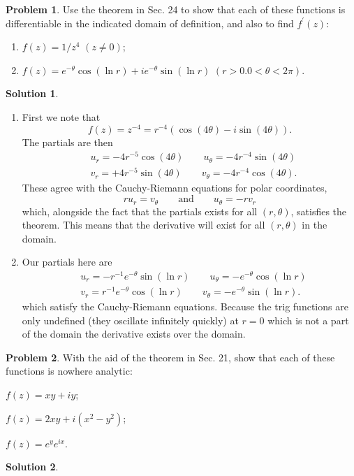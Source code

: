 \documentclass[10pt]{article}
\theoremstyle{definition}
\newtheorem{problem}{Problem}
\newtheorem{soln}{Solution}
\newcommand{\primed}[1]{#1^\prime}
\begin{document}
\begin{problem}
Use the theorem in Sec. 24 to show that each of these functions is differentiable in the
indicated domain of definition, and also to find $\primed{f}(z)$:
\begin{enumerate}[label=(\alph*)]
  \item $f(z)=1/z^4$ $(z\neq 0)$;
  \item $f(z)=e^{-\theta}\cos\left(\ln r\right)+ie^{-\theta}\sin\left(\ln r\right)$ $(r>0. 0<\theta<2\pi)$.
\end{enumerate}
\end{problem}
\begin{soln}~
  \begin{enumerate}[label=(\alph*)]
    \item First we note that
          $$f(z)=z^{-4}=r^{-4}\left(\cos\left(4\theta\right)-i\sin\left(4\theta\right)\right).$$
          The partials are then
          \begin{align*}
             & u_r=-4r^{-5}\cos\left(4\theta\right)\qquad u_\theta=-4r^{-4}\sin\left(4\theta\right)  \\
             & v_r=+4r^{-5}\sin\left(4\theta\right)\qquad v_\theta=-4r^{-4}\cos\left(4\theta\right).
          \end{align*}
          These agree with the Cauchy-Riemann equations for polar coordinates,
          $$ru_r=v_\theta\qquad\text{and}\qquad u_\theta=-rv_r$$
          which, alongside the fact that the partials exists for all $(r,\theta)$, satisfies
          the theorem. This means that the derivative will exist for all $(r,\theta)$ in the domain.
    \item Our partials here are
          \begin{align*}
             & u_r=-r^{-1}e^{-\theta}\sin\left(\ln r\right)\qquad u_\theta=-e^{-\theta}\cos\left(\ln r\right) \\
             & v_r=r^{-1}e^{-\theta}\cos\left(\ln r\right)\qquad v_\theta=-e^{-\theta}\sin\left(\ln r\right).
          \end{align*}
          which satisfy the Cauchy-Riemann equations. Because the trig functions are only undefined (they oscillate infinitely quickly) at $r=0$ which is not 
          a part of the domain the derivative exists over the domain.
  \end{enumerate}
\end{soln}

\begin{problem}
With the aid of the theorem in Sec. 21, show that each of these functions is nowhere
analytic:
\begin{enumerate*}[label=(\alph*)]
  \item $f(z)=xy+iy$;\qquad~
  \item $f(z)=2xy+i(x^2-y^2)$;\qquad~
  \item $f(z)=e^ye^{ix}$.
\end{enumerate*}
\end{problem}
\begin{soln}
\end{soln}
\end{document}
